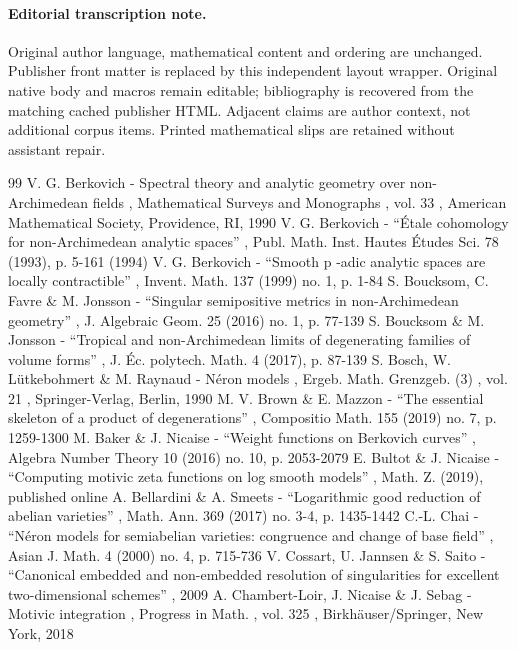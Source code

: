 \documentclass[11pt]{article}
\begin{document}
\paragraph{Editorial transcription note.}
Original author language, mathematical content and ordering are unchanged. Publisher front matter is replaced by this independent layout wrapper. Original native body and macros remain editable; bibliography is recovered from the matching cached publisher HTML. Adjacent claims are author context, not additional corpus items. Printed mathematical slips are retained without assistant repair.
\clearpage

\begin{thebibliography}{99}
 V. G. Berkovich - Spectral theory and analytic geometry over non-Archimedean fields , Mathematical Surveys and Monographs , vol. 33 , American Mathematical Society, Providence, RI, 1990
 V. G. Berkovich - “Étale cohomology for non-Archimedean analytic spaces” , Publ. Math. Inst. Hautes Études Sci. 78 (1993), p. 5-161 (1994)
 V. G. Berkovich - “Smooth p -adic analytic spaces are locally contractible” , Invent. Math. 137 (1999) no. 1, p. 1-84
 S. Boucksom, C. Favre \& M. Jonsson - “Singular semipositive metrics in non-Archimedean geometry” , J. Algebraic Geom. 25 (2016) no. 1, p. 77-139
 S. Boucksom \& M. Jonsson - “Tropical and non-Archimedean limits of degenerating families of volume forms” , J. Éc. polytech. Math. 4 (2017), p. 87-139
 S. Bosch, W. Lütkebohmert \& M. Raynaud - Néron models , Ergeb. Math. Grenzgeb. (3) , vol. 21 , Springer-Verlag, Berlin, 1990
 M. V. Brown \& E. Mazzon - “The essential skeleton of a product of degenerations” , Compositio Math. 155 (2019) no. 7, p. 1259-1300
 M. Baker \& J. Nicaise - “Weight functions on Berkovich curves” , Algebra Number Theory 10 (2016) no. 10, p. 2053-2079
 E. Bultot \& J. Nicaise - “Computing motivic zeta functions on log smooth models” , Math. Z. (2019), published online
 A. Bellardini \& A. Smeets - “Logarithmic good reduction of abelian varieties” , Math. Ann. 369 (2017) no. 3-4, p. 1435-1442
 C.-L. Chai - “Néron models for semiabelian varieties: congruence and change of base field” , Asian J. Math. 4 (2000) no. 4, p. 715-736
 V. Cossart, U. Jannsen \& S. Saito - “Canonical embedded and non-embedded resolution of singularities for excellent two-dimensional schemes” , 2009
 A. Chambert-Loir, J. Nicaise \& J. Sebag - Motivic integration , Progress in Math. , vol. 325 , Birkhäuser/Springer, New York, 2018

\end{thebibliography}
\end{document}
